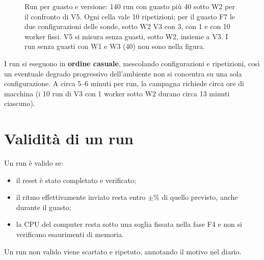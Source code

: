 \begin{figure}[htbp]
\centering
{}
\caption{Run per guasto e versione: 140 run con guasto più 40 sotto W2 per il confronto di V5. Ogni cella vale 10 ripetizioni; per il guasto F7 le due configurazioni delle sonde, sotto W2 V3 con 3, con 1 e con 10 worker fissi. V5 si misura senza guasti, sotto W2, insieme a V3. I run senza guasti con W1 e W3 (40) non sono nella figura.}
\label{fig:matrice}
\end{figure}

I run si eseguono in \textbf{ordine casuale}, mescolando configurazioni e ripetizioni, così un eventuale degrado progressivo dell'ambiente non si concentra su una sola configurazione. A circa 5--6 minuti per run, la campagna richiede circa  ore di macchina (i 10 run di V3 con 1 worker sotto W2 durano circa 13 minuti ciascuno).

\section{Validità di un run}

Un run è valido se:
\begin{itemize}
  \item il reset è stato completato e verificato;
  \item il ritmo effettivamente inviato resta entro $\pm$\% di quello previsto, anche durante il guasto;
  \item la CPU del computer resta sotto una soglia fissata nella fase F4 e non si verificano esaurimenti di memoria.
\end{itemize}
Un run non valido viene scartato e ripetuto, annotando il motivo nel diario.

